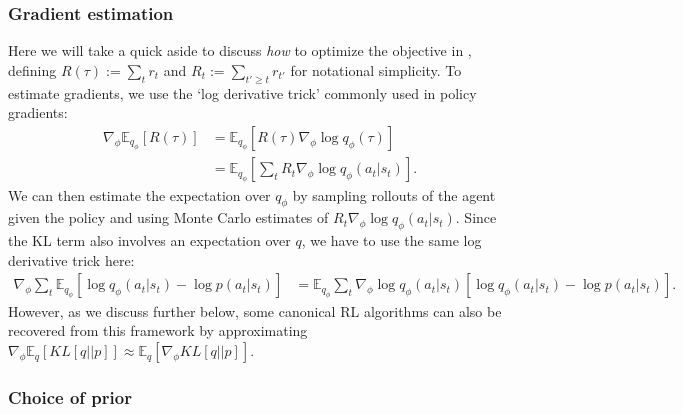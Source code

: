 \subsubsection*{Gradient estimation}

Here we will take a quick aside to discuss \emph{how} to optimize the objective in , defining $R(\tau) := \sum_t r_t$ and $R_t := \sum_{t' \geq t} r_{t'}$ for notational simplicity.
To estimate gradients, we use the `log derivative trick' commonly used in policy gradients:
\begin{align}
    \nabla_\phi \mathbb{E}_{q_\phi} \left [ R(\tau) \right ] & =  \mathbb{E}_{q_\phi} \left [ R(\tau) \nabla_\phi \log q_\phi (\tau) \right ]        \\
                                                             & = \mathbb{E}_{q_\phi} \left [ \sum_t R_t \nabla_\phi \log q_\phi(a_t | s_t) \right ].
\end{align}
We can then estimate the expectation over $q_\phi$ by sampling rollouts of the agent given the policy and using Monte Carlo estimates of $R_t \nabla_\phi \log q_\phi(a_t | s_t)$.
Since the KL term also involves an expectation over $q$, we have to use the same log derivative trick here:
\begin{align}
    \nabla_\phi \sum_t \mathbb{E}_{q_\phi} \left [ \log q_\phi(a_t|s_t) - \log p(a_t | s_t) \right ]
     & =  \mathbb{E}_{q_\phi} \sum_t \nabla_\phi \log q_\phi(a_t | s_t) \left [ \log q_\phi(a_t|s_t) - \log p(a_t | s_t) \right ].
\end{align}
However, as we discuss further below, some canonical RL algorithms can also be recovered from this framework by approximating $\nabla_\phi \mathbb{E}_q [ KL[q || p] ] \approx \mathbb{E}_q [ \nabla_\phi KL[q || p] ] $.

\subsubsection*{Choice of prior}

